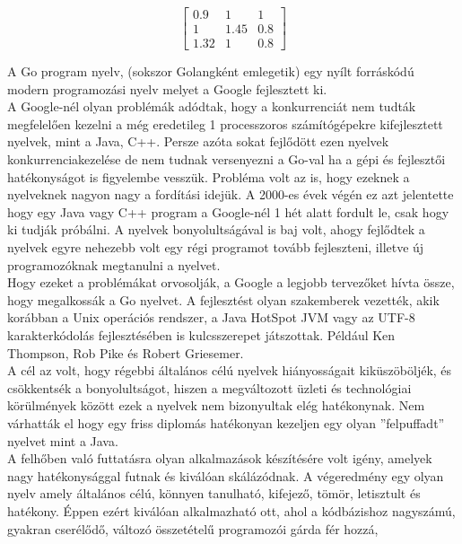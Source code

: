 \[
\begin{bmatrix}
    0.9 & 1 & 1 \\
    1 & 1.45 & 0.8\\
    1.32 & 1 & 0.8
\end{bmatrix}
\]


A Go program nyelv, (sokszor Golangként emlegetik) egy nyílt forráskódú modern programozási nyelv melyet a Google fejlesztett ki.\\
A Google-nél olyan problémák adódtak, hogy a konkurrenciát nem tudták megfelelően kezelni a még eredetileg
1 processzoros számítógépekre kifejlesztett nyelvek, mint a Java, C++.
Persze azóta sokat fejlődött ezen nyelvek konkurrenciakezelése de nem tudnak versenyezni a Go-val
ha a gépi és fejlesztői hatékonyságot is figyelembe vesszük.
Probléma volt az is, hogy ezeknek a nyelveknek nagyon nagy a fordítási idejük. A 2000-es évek végén ez azt jelentette
hogy egy Java vagy C++ program a Google-nél 1 hét alatt fordult le, csak hogy ki tudják próbálni.
A nyelvek bonyolultságával is baj volt, ahogy fejlődtek a nyelvek egyre nehezebb volt egy régi programot tovább fejleszteni,
illetve új programozóknak megtanulni a nyelvet.\\
Hogy ezeket a problémákat orvosolják, a Google a legjobb tervezőket hívta össze, hogy megalkossák a Go nyelvet.
A fejlesztést olyan szakemberek vezették, akik korábban a Unix operációs rendszer, a Java HotSpot JVM
vagy az UTF-8 karakterkódolás fejlesztésében is kulcsszerepet játszottak.
Például Ken Thompson, Rob Pike és Robert Griesemer.\\
A cél az volt, hogy régebbi általános célú nyelvek hiányosságait kiküszöböljék, és csökkentsék a bonyolultságot, hiszen a megváltozott üzleti és technológiai körülmények
között ezek a nyelvek nem bizonyultak elég hatékonynak.
Nem várhatták el hogy egy friss diplomás hatékonyan kezeljen egy olyan ''felpuffadt'' nyelvet mint a Java.\\
A felhőben való futtatásra olyan alkalmazások készítésére volt igény, amelyek nagy hatékonysággal futnak és kiválóan skálázódnak.
A végeredmény egy olyan nyelv amely általános célú, könnyen tanulható, kifejező, tömör, letisztult és hatékony.
Éppen ezért kiválóan alkalmazható ott, ahol a kódbázishoz nagyszámú, gyakran cserélődő, változó összetételű programozói gárda fér hozzá,
